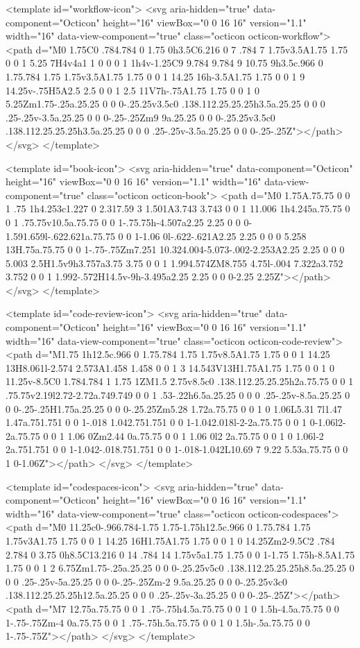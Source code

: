 <template id="workflow-icon">
  <svg aria-hidden="true" data-component="Octicon" height="16" viewBox="0 0 16 16" version="1.1" width="16" data-view-component="true" class="octicon octicon-workflow">
    <path d="M0 1.75C0 .784.784 0 1.75 0h3.5C6.216 0 7 .784 7 1.75v3.5A1.75 1.75 0 0 1 5.25 7H4v4a1 1 0 0 0 1 1h4v-1.25C9 9.784 9.784 9 10.75 9h3.5c.966 0 1.75.784 1.75 1.75v3.5A1.75 1.75 0 0 1 14.25 16h-3.5A1.75 1.75 0 0 1 9 14.25v-.75H5A2.5 2.5 0 0 1 2.5 11V7h-.75A1.75 1.75 0 0 1 0 5.25Zm1.75-.25a.25.25 0 0 0-.25.25v3.5c0 .138.112.25.25.25h3.5a.25.25 0 0 0 .25-.25v-3.5a.25.25 0 0 0-.25-.25Zm9 9a.25.25 0 0 0-.25.25v3.5c0 .138.112.25.25.25h3.5a.25.25 0 0 0 .25-.25v-3.5a.25.25 0 0 0-.25-.25Z"></path>
</svg>
</template>

<template id="book-icon">
  <svg aria-hidden="true" data-component="Octicon" height="16" viewBox="0 0 16 16" version="1.1" width="16" data-view-component="true" class="octicon octicon-book">
    <path d="M0 1.75A.75.75 0 0 1 .75 1h4.253c1.227 0 2.317.59 3 1.501A3.743 3.743 0 0 1 11.006 1h4.245a.75.75 0 0 1 .75.75v10.5a.75.75 0 0 1-.75.75h-4.507a2.25 2.25 0 0 0-1.591.659l-.622.621a.75.75 0 0 1-1.06 0l-.622-.621A2.25 2.25 0 0 0 5.258 13H.75a.75.75 0 0 1-.75-.75Zm7.251 10.324.004-5.073-.002-2.253A2.25 2.25 0 0 0 5.003 2.5H1.5v9h3.757a3.75 3.75 0 0 1 1.994.574ZM8.755 4.75l-.004 7.322a3.752 3.752 0 0 1 1.992-.572H14.5v-9h-3.495a2.25 2.25 0 0 0-2.25 2.25Z"></path>
</svg>
</template>

<template id="code-review-icon">
  <svg aria-hidden="true" data-component="Octicon" height="16" viewBox="0 0 16 16" version="1.1" width="16" data-view-component="true" class="octicon octicon-code-review">
    <path d="M1.75 1h12.5c.966 0 1.75.784 1.75 1.75v8.5A1.75 1.75 0 0 1 14.25 13H8.061l-2.574 2.573A1.458 1.458 0 0 1 3 14.543V13H1.75A1.75 1.75 0 0 1 0 11.25v-8.5C0 1.784.784 1 1.75 1ZM1.5 2.75v8.5c0 .138.112.25.25.25h2a.75.75 0 0 1 .75.75v2.19l2.72-2.72a.749.749 0 0 1 .53-.22h6.5a.25.25 0 0 0 .25-.25v-8.5a.25.25 0 0 0-.25-.25H1.75a.25.25 0 0 0-.25.25Zm5.28 1.72a.75.75 0 0 1 0 1.06L5.31 7l1.47 1.47a.751.751 0 0 1-.018 1.042.751.751 0 0 1-1.042.018l-2-2a.75.75 0 0 1 0-1.06l2-2a.75.75 0 0 1 1.06 0Zm2.44 0a.75.75 0 0 1 1.06 0l2 2a.75.75 0 0 1 0 1.06l-2 2a.751.751 0 0 1-1.042-.018.751.751 0 0 1-.018-1.042L10.69 7 9.22 5.53a.75.75 0 0 1 0-1.06Z"></path>
</svg>
</template>

<template id="codespaces-icon">
  <svg aria-hidden="true" data-component="Octicon" height="16" viewBox="0 0 16 16" version="1.1" width="16" data-view-component="true" class="octicon octicon-codespaces">
    <path d="M0 11.25c0-.966.784-1.75 1.75-1.75h12.5c.966 0 1.75.784 1.75 1.75v3A1.75 1.75 0 0 1 14.25 16H1.75A1.75 1.75 0 0 1 0 14.25Zm2-9.5C2 .784 2.784 0 3.75 0h8.5C13.216 0 14 .784 14 1.75v5a1.75 1.75 0 0 1-1.75 1.75h-8.5A1.75 1.75 0 0 1 2 6.75Zm1.75-.25a.25.25 0 0 0-.25.25v5c0 .138.112.25.25.25h8.5a.25.25 0 0 0 .25-.25v-5a.25.25 0 0 0-.25-.25Zm-2 9.5a.25.25 0 0 0-.25.25v3c0 .138.112.25.25.25h12.5a.25.25 0 0 0 .25-.25v-3a.25.25 0 0 0-.25-.25Z"></path><path d="M7 12.75a.75.75 0 0 1 .75-.75h4.5a.75.75 0 0 1 0 1.5h-4.5a.75.75 0 0 1-.75-.75Zm-4 0a.75.75 0 0 1 .75-.75h.5a.75.75 0 0 1 0 1.5h-.5a.75.75 0 0 1-.75-.75Z"></path>
</svg>
</template>


